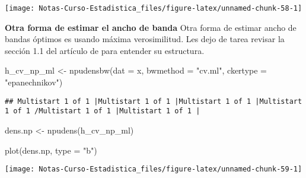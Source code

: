 \documentclass[
  12pt,
]{book}
\newenvironment{Shaded}{\begin{snugshade}}{\end{snugshade}}
\newcommand{\AttributeTok}[1]{\textcolor[rgb]{0.77,0.63,0.00}{#1}}
\newcommand{\FunctionTok}[1]{\textcolor[rgb]{0.00,0.00,0.00}{#1}}
\newcommand{\NormalTok}[1]{#1}
\newcommand{\OtherTok}[1]{\textcolor[rgb]{0.56,0.35,0.01}{#1}}
\newcommand{\StringTok}[1]{\textcolor[rgb]{0.31,0.60,0.02}{#1}}
\theoremstyle{definition}
\theoremstyle{definition}
\theoremstyle{definition}
\theoremstyle{definition}
\theoremstyle{remark}
\begin{document}
\begin{center}\texttt{[image: Notas-Curso-Estadistica\_files/figure-latex/unnamed-chunk-58-1]} \end{center}

\textbf{Otra forma de estimar el ancho de banda} Otra forma de estimar ancho
de bandas óptimos es usando máxima verosimilitud. Les dejo de tarea
revisar la sección 1.1 del artículo de \autocite{Hall1987} para entender su
estructura.

\begin{Shaded}
\begin{Highlighting}[]
\NormalTok{h\_cv\_np\_ml }\OtherTok{\textless{}{-}} \FunctionTok{npudensbw}\NormalTok{(}\AttributeTok{dat =}\NormalTok{ x, }\AttributeTok{bwmethod =} \StringTok{"cv.ml"}\NormalTok{,}
    \AttributeTok{ckertype =} \StringTok{"epanechnikov"}\NormalTok{)}
\end{Highlighting}
\end{Shaded}

\begin{verbatim}
## Multistart 1 of 1 |Multistart 1 of 1 |Multistart 1 of 1 |Multistart 1 of 1 /Multistart 1 of 1 |Multistart 1 of 1 |                   
\end{verbatim}

\begin{Shaded}
\begin{Highlighting}[]
\NormalTok{dens.np }\OtherTok{\textless{}{-}} \FunctionTok{npudens}\NormalTok{(h\_cv\_np\_ml)}

\FunctionTok{plot}\NormalTok{(dens.np, }\AttributeTok{type =} \StringTok{"b"}\NormalTok{)}
\end{Highlighting}
\end{Shaded}

\begin{center}\texttt{[image: Notas-Curso-Estadistica\_files/figure-latex/unnamed-chunk-59-1]} \end{center}
\end{document}
